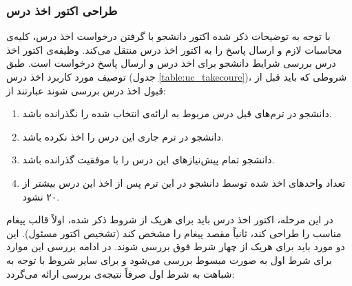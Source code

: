 \subsubsection{طراحی اکتور اخذ درس}

با توجه به توضیحات ذکر شده اکتور دانشجو با گرفتن درخواست اخذ درس، کلیه‌ی محاسبات لازم و ارسال پاسخ را به اکتور اخذ درس منتقل می‌کند. وظیفه‌ی اکتور اخذ درس بررسی شرایط دانشجو برای اخذ درس و ارسال پاسخ درخواست است. طبق توصیف مورد کاربرد اخذ درس (جدول \ref{table:uc_takecoure})، شروطی که باید قبل از قبول اخذ درس بررسی شوند عبارتند از:
\begin{enumerate}
\item دانشجو در ترم‌های قبل درس مربوط به ارائه‌ی انتخاب شده را  نگذرانده باشد.
\item دانشجو در ترم‌ جاری این درس را اخذ نکرده باشد.
\item دانشجو تمام پیش‌نیاز‌های این درس را با موفقیت گذرانده باشد.
\item تعداد واحد‌های اخذ شده توسط دانشجو در این ترم پس از اخذ این درس بیشتر از ۲۰ نشود.
\end{enumerate}
در این مرحله، اکتور اخذ درس باید برای هریک از شروط ذکر شده، اولاً قالب پیغام مناسب را طراحی کند، ثانیاً مقصد پیغام را مشخص کند (تشخیص اکتور مسئول). این دو مورد باید برای هریک از چهار شرط فوق بررسی شوند. در ادامه بررسی این موارد برای شرط اول به صورت مبسوط بررسی می‌شود و برای سایر شروط با توجه به شباهت به شرط اول صرفاً نتیجه‌ی بررسی ارائه می‌گردد:
